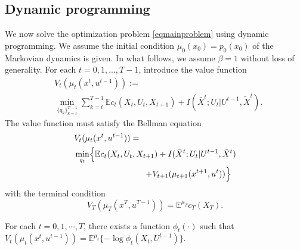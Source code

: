 \subsection{Dynamic programming}
We now solve the optimization problem \eqref{eqmainproblem} using dynamic programming. We assume the initial condition $\mu_0(x_0)=p_0(x_0)$ of the Markovian dynamics is given. In what follows, we assume $\beta=1$ without loss of generality. For each $t=0, 1, ... , T-1$, introduce the value function
\begin{align*}
&V_t(\mu_t(x^t, u^{t-1})):= \\
& \min_{\{q_k\}_{k=t}^{T-1}} \sum_{k=t}^{T-1} \mathbb{E}c_t(X_t, U_t, X_{t+1})+I(\bar{X}^t; U_t|U^{t-1}, \tilde{X}^t).
\end{align*}
The value function must satisfy the Bellman equation
\begin{align}
&V_t(\mu_t(x^t, u^{t-1}))= \nonumber \\
&\min_{q_t} \Bigl\{ \mathbb{E}c_t(X_t, U_t, X_{t+1})+ I(\bar{X}^t; U_t|U^{t-1}, \tilde{X}^t) \Bigr. \nonumber \\
&\hspace{20ex}\Bigl. + V_{t+1}(\mu_{t+1}(x^{t+1}, u^t)) \Bigr\} \label{eqbellman}
\end{align}
with the terminal condition
\[
V_T(\mu_T(x^T, u^{T-1}))=\mathbb{E}^{\mu_T} c_T(X_T).
\]
\begin{lemma}\label{lemvalue}
For each $t=0, 1, \cdots , T$, there exists a function $\phi_t(\cdot)$ such that
$V_t(\mu_t(x^t, u^{t-1}))=\mathbb{E}^{\mu_t}\{-\log \phi_t(X_t, U^{t-1})\}$.
\end{lemma}
